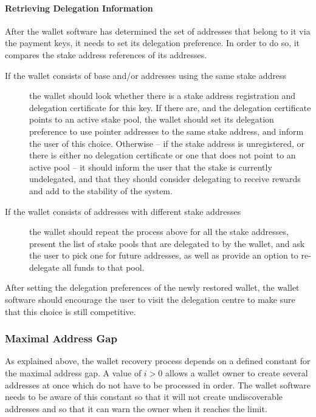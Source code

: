 \documentclass[11pt,a4paper,dvipsnames,twosided]{article}
\begin{document}
\paragraph{Retrieving Delegation Information}

After the wallet software has determined the set of addresses that
belong to it via the payment keys, it needs to set its delegation
preference. In order to do so, it compares the stake address references
of its addresses.

\begin{description}
\item[If the wallet consists of base and/or addresses using the same
  stake address] the wallet should look whether there is a stake address
  registration and delegation certificate for this key. If there are,
  and the delegation certificate points to an active stake pool, the
  wallet should set its delegation preference to use pointer addresses
  to the same stake address, and inform the user of this
  choice. Otherwise -- if the stake address is unregistered, or there is
  either no delegation certificate or one that does not point to an
  active pool -- it should inform the user that the stake is currently
  undelegated, and that they should consider delegating to receive
  rewards and add to the stability of the system.

\item[If the wallet consists of addresses with different stake addresses]
  the wallet should repeat the process above for all the stake addresses,
  present the list of stake pools that are delegated to by the wallet,
  and ask the user to pick one for future addresses, as well as
  provide an option to re-delegate all funds to that pool.
\end{description}

After setting the delegation preferences of the newly restored wallet,
the wallet software should encourage the user to visit the delegation
centre to make sure that this choice is still competitive.

\subsubsection{Maximal Address Gap}
\label{maximal-address-gap}

As explained above, the wallet recovery process depends on a defined
constant for the maximal address gap. A value of \(i>0\) allows a wallet
owner to create several addresses at once which do not have to be
processed in order. The wallet software needs to be aware of this
constant so that it will not create undiscoverable addresses and so that
it can warn the owner when it reaches the limit.
\end{document}
